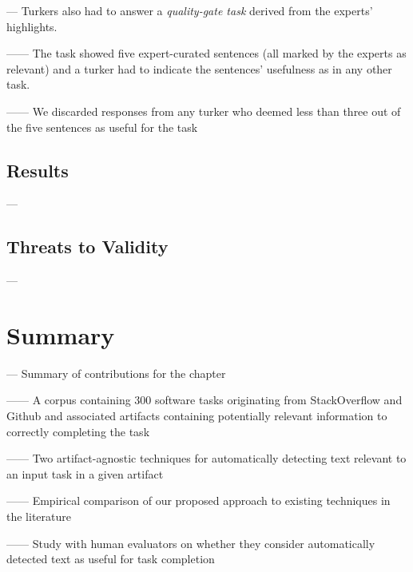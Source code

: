 --- Turkers also had to answer a \textit{quality-gate task} derived from the experts' highlights.

------ The task showed five expert-curated sentences (all marked by the experts as relevant) and a turker had to indicate the sentences' usefulness as in any other task.

------ We discarded responses from any turker who deemed less than three out of the five sentences as useful for the task



\subsection{Results}

---  \vspace{3mm}

\subsection{Threats to Validity}

---  \vspace{3mm}

\clearpage

\section{Summary}

--- Summary of contributions for the chapter \vspace{3mm}

------ A corpus containing 300 software tasks originating from StackOverflow and Github and associated artifacts containing potentially relevant information to correctly completing the task \vspace{3mm}

------ Two artifact-agnostic techniques for automatically detecting text relevant to an input task in a given artifact

------ Empirical comparison of our proposed approach to existing techniques in the literature

------ Study with human evaluators on whether they consider automatically detected text as useful for task completion

